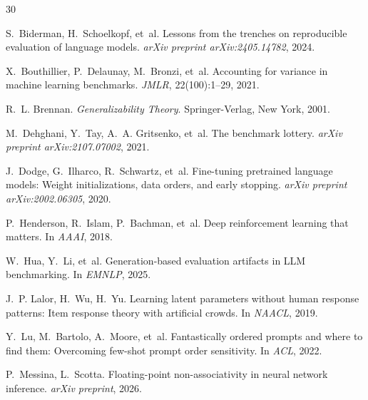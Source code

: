 \documentclass[11pt]{article}
\begin{document}

\begin{thebibliography}{30}

S.~Biderman, H.~Schoelkopf, et~al.
\newblock Lessons from the trenches on reproducible evaluation of language models.
\newblock \emph{arXiv preprint arXiv:2405.14782}, 2024.

X.~Bouthillier, P.~Delaunay, M.~Bronzi, et~al.
\newblock Accounting for variance in machine learning benchmarks.
\newblock \emph{JMLR}, 22(100):1--29, 2021.

R.~L. Brennan.
\newblock \emph{Generalizability Theory}.
\newblock Springer-Verlag, New York, 2001.

M.~Dehghani, Y.~Tay, A.~A. Gritsenko, et~al.
\newblock The benchmark lottery.
\newblock \emph{arXiv preprint arXiv:2107.07002}, 2021.

J.~Dodge, G.~Ilharco, R.~Schwartz, et~al.
\newblock Fine-tuning pretrained language models: Weight initializations, data orders, and early stopping.
\newblock \emph{arXiv preprint arXiv:2002.06305}, 2020.

P.~Henderson, R.~Islam, P.~Bachman, et~al.
\newblock Deep reinforcement learning that matters.
\newblock In \emph{AAAI}, 2018.

W.~Hua, Y.~Li, et~al.
\newblock Generation-based evaluation artifacts in LLM benchmarking.
\newblock In \emph{EMNLP}, 2025.

J.~P. Lalor, H.~Wu, H.~Yu.
\newblock Learning latent parameters without human response patterns: Item response theory with artificial crowds.
\newblock In \emph{NAACL}, 2019.

Y.~Lu, M.~Bartolo, A.~Moore, et~al.
\newblock Fantastically ordered prompts and where to find them: Overcoming few-shot prompt order sensitivity.
\newblock In \emph{ACL}, 2022.

P.~Messina, L.~Scotta.
\newblock Floating-point non-associativity in neural network inference.
\newblock \emph{arXiv preprint}, 2026.


\end{thebibliography}
\end{document}

